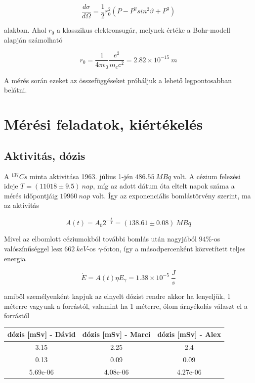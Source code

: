\documentclass[a4paper,12pt]{article}
\begin{document}
\begin{equation*}
	\frac{d\sigma}{d\Omega} = \frac{1}{2}r_{0}^{2}(P - P^{2}sin^{2}\vartheta + P^{3})
\end{equation*}

alakban. Ahol $r_{0}$ a klasszikus elektronsugár, melynek értéke a Bohr-modell alapján számolható

\begin{equation*}
	r_{0} = \frac{1}{4\pi\epsilon_{0}}\frac{e^{2}}{m_{e}c^{2}} = 2.82 \times 10^{-15} ~m
\end{equation*}

\par A mérés során ezeket az összefüggéseket próbáljuk a lehető legpontosabban belátni.

\section{Mérési feladatok, kiértékelés}

\subsection{Aktivitás, dózis}

\par A $^{137}Cs$ minta aktivitása 1963. július 1-jén $486.55~MBq$ volt. A cézium felezési ideje $T = (11018 \pm 9.5)~nap$, míg az adott dátum óta eltelt napok száma a mérés időpontjáig $19 960~nap$ volt. Így az exponenciális bomlástörvény szerint, ma az aktivitás

\begin{equation*}
	A(t) = A_{0}2^{-\frac{t}{T}} = (138.61 \pm 0.08)~MBq
\end{equation*}

\par Mivel az elbomlott céziumokból további bomlás után nagyjából $94\%$-os valószínűséggel lesz $662~keV$-os $\gamma$-foton, így a másodpercenként közvetített teljes energia

\begin{equation*}
	\dot{E} = A(t)\eta E_{\gamma} = 1.38 \times 10^{-5} ~\frac{J}{s} 
\end{equation*}

amiből személyenként kapjuk az elnyelt dózist rendre akkor ha lenyeljük, 1 méterre vagyunk a forrástól, valamint ha 1 méterre, ólom árnyékolás választ el a forrástól

\begin{center}
\begin{tabular}{|c|c|c|}
\hline
dózis [mSv] - Dávid & dózis [mSv] - Marci & dózis [mSv] - Alex \\
\hline
3.15 & 2.25 & 2.4 \\
\hline
0.13 & 0.09 & 0.09 \\
\hline
5.69e-06 & 4.08e-06 & 4.27e-06 \\
\hline
\end{tabular}
\end{center}
\end{document}
